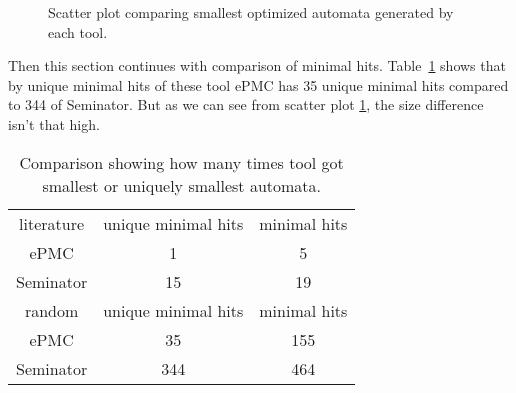 \documentclass[
	digital,
nolof, nolot
]{fithesis3}
\begin{document}
\begin{figure}[ht]
	\centering
	
	\caption{Scatter plot comparing smallest optimized automata generated by each tool. }
	\label{scatter:slim-epmc}
	\begin{tikzpicture}
		
	\end{tikzpicture}
\end{figure}
Then this section continues with comparison of minimal hits. Table~\ref{table:epmc-seminator-min-hits} shows that by unique minimal hits of these tool ePMC has 35 unique minimal hits compared to 344 of Seminator. But as we can see from scatter plot \ref{scatter:slim-epmc}, the size difference isn't that high.
\begin{table}[ht]
	\centering
	
	\caption{Comparison showing how many times tool got smallest or uniquely smallest automata.}
	\label{table:epmc-seminator-min-hits}
	\begin{tabular}{ |c||c|c| } 
		\hline
		literature&unique minimal hits&minimal hits\\
		\hhline{|===|}
		ePMC&1 & 5\\
		\hline
		Seminator &15 & 19\\ 
		\hline
		\hline
		random&unique minimal hits&minimal hits\\
		\hhline{|===|}
		ePMC&35 & 155\\
		\hline
		Seminator &344 & 464\\ 
		\hline
	\end{tabular}
\end{table}
		
	
	
	
		
		
\end{document}
